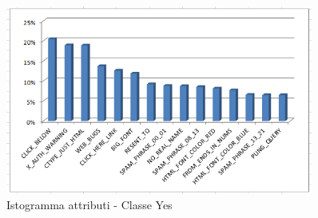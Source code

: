 \begin{figure}[hbtp]
	\centering
	\includegraphics[width=0.9\textwidth]{./images/Histogram_Yes.png}
	\caption{Istogramma attributi - Classe Yes}
	\label{YesHist}
\end{figure}